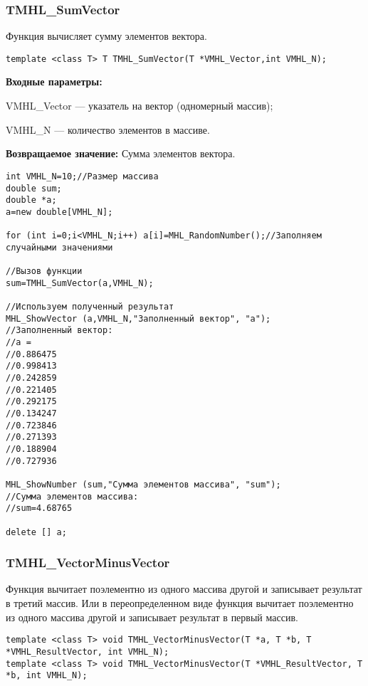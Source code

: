 \documentclass[a4paper,12pt]{article}
\begin{document}
\subsubsection{TMHL\_SumVector}\label{TMHL_SumVector}

Функция вычисляет сумму элементов вектора.


\begin{lstlisting}[label=code_syntax_TMHL_SumVector,caption=Синтаксис]
template <class T> T TMHL_SumVector(T *VMHL_Vector,int VMHL_N);
\end{lstlisting}

\textbf{Входные параметры:}

 VMHL\_Vector --- указатель на вектор (одномерный массив);
 
 VMHL\_N --- количество элементов в массиве.

\textbf{Возвращаемое значение:}
Сумма элементов вектора.


\begin{lstlisting}[label=code_use_TMHL_SumVector,caption=Пример использования]
int VMHL_N=10;//Размер массива
double sum;
double *a;
a=new double[VMHL_N];

for (int i=0;i<VMHL_N;i++) a[i]=MHL_RandomNumber();//Заполняем случайными значениями

//Вызов функции
sum=TMHL_SumVector(a,VMHL_N);

//Используем полученный результат
MHL_ShowVector (a,VMHL_N,"Заполненный вектор", "a");
//Заполненный вектор:
//a =
//0.886475
//0.998413
//0.242859
//0.221405
//0.292175
//0.134247
//0.723846
//0.271393
//0.188904
//0.727936

MHL_ShowNumber (sum,"Сумма элементов массива", "sum");
//Сумма элементов массива:
//sum=4.68765

delete [] a;
\end{lstlisting}

\subsubsection{TMHL\_VectorMinusVector}\label{TMHL_VectorMinusVector}

Функция вычитает поэлементно из одного массива другой и записывает результат в третий массив. Или в переопределенном виде функция вычитает поэлементно из одного массива другой и записывает результат в первый массив.


\begin{lstlisting}[label=code_syntax_TMHL_VectorMinusVector,caption=Синтаксис]
template <class T> void TMHL_VectorMinusVector(T *a, T *b, T *VMHL_ResultVector, int VMHL_N);
template <class T> void TMHL_VectorMinusVector(T *VMHL_ResultVector, T *b, int VMHL_N);
\end{lstlisting}
\end{document}
